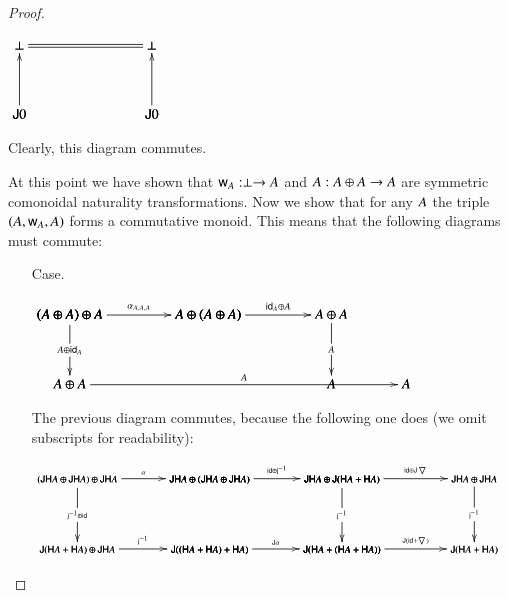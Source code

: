 \documentclass{lmcs}
\let\mto\to
\let\to\relax
\newcommand{\to}{\rightarrow}
\let\c\relax
\let\j\relax
\let\wn\relax
\newcommand{\func}[1]{\mathsf{#1}}
\newcommand{\J}[0]{\func{J}}
\newcommand{\id}[0]{\mathsf{id}}
\newcommand{\w}[1]{\mathsf{w}_{#1}}
\newcommand{\c}[1]{\mathsf{c}_{#1}}
\newcommand{\j}[1]{\mathsf{j}_{#1}}
\newcommand{\jinv}[1]{\mathsf{j}^{-1}_{#1}}
\newcommand{\wn}[0]{\mathop{?}}
\newcommand{\codiag}[1]{\bigtriangledown_{#1}}
\newenvironment{diagram}{
  \begin{center}
    \begin{math}
      \bfig
}{
      \efig
    \end{math}
  \end{center}
}
\begin{document}
\begin{proof}
\begin{itemize}
\begin{itemize}
\begin{diagram}
        \square(0,1500)/=`<-`<-`/<950,500>[
          \perp`
          \perp`
          \J0`
          \J0;
          `
          \j{}`
          \j{}`]
      \end{diagram}
      Clearly, this diagram commutes.
    \end{itemize}
  \end{itemize}
  At this point we have shown that $\w{A} : \perp \mto \wn A$ and
  $\c{A} : \wn A \oplus \wn A \mto \wn A$ are symmetric comonoidal
  naturality transformations.  Now we show that for any $\wn A$ the
  triple $(\wn A,\w{A},\c{A})$ forms a commutative monoid.  This means
  that the following diagrams must commute:
  \begin{itemize}
  \item[Case.]\ \\
    \begin{diagram}
      \hSquares|aammmmm|/->`->```->``/[
        (\wn A \oplus \wn A) \oplus \wn A`
        \wn A \oplus (\wn A \oplus \wn A)`
        \wn A \oplus \wn A```
        \wn A;
        \alpha_{\wn A,\wn A,\wn A}`
        \id_{\wn A} \oplus \c{A}```
        \c{A}``]
      \btriangle|maa|/->``->/<2407,500>[(\wn A \oplus \wn A) \oplus \wn A`
        \wn A \oplus \wn A`
        \wn A;
        \c{A} \oplus \id_{A}``
        \c{A}]
    \end{diagram}
    The previous diagram commutes, because the following one does (we
    omit subscripts for readability):
    \begin{diagram}
      \scriptsize
      \square|amma|/->`->``->/<950,500>[
        (\func{JH}A \oplus \func{JH}A) \oplus \func{JH}A`
        \func{JH}A \oplus (\func{JH}A \oplus \func{JH}A)`
        \func{J}(\func{H}A + \func{H}A) \oplus \func{JH}A`
        \func{J}((\func{H}A + \func{H}A) + \func{H}A);
        \alpha`
        \jinv{} \oplus \id``
        \jinv{}]

      \square(950,0)|amma|/->``->`->/<950,500>[
        \func{JH}A \oplus (\func{JH}A \oplus \func{JH}A)`
        \func{JH}A \oplus \func{J}(\func{H}A + \func{H}A)`
        \func{J}((\func{H}A + \func{H}A) + \func{H}A)`
        \func{J}(\func{H}A + (\func{H}A + \func{H}A));
        \id \oplus \jinv{}``
        \jinv{}`
        \func{J}\alpha]

      \square(1900,0)|amma|/->``->`->/<950,500>[
        \func{JH}A \oplus \func{J}(\func{H}A + \func{H}A)`
        \func{JH}A \oplus \func{JH}A`
        \func{J}(\func{H}A + (\func{H}A + \func{H}A))`
        \func{J}(\func{H}A + \func{H}A);
        \id \oplus \func{J}\codiag{}``
        \jinv{}`
        \func{J}(\id + \codiag{})]


\end{diagram}
\end{itemize}
\end{proof}
\end{document}

